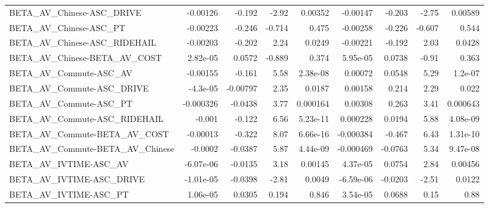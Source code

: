 \begin{tabular}{lrrrrrrrr}
BETA\_AV\_Chinese-ASC\_DRIVE                          &    -0.00126 &       -0.192 &     -2.92 &  0.00352 &   -0.00147 &      -0.203 &        -2.75 &       0.00589 \\
BETA\_AV\_Chinese-ASC\_PT                             &    -0.00223 &       -0.246 &    -0.714 &    0.475 &   -0.00258 &      -0.226 &       -0.607 &         0.544 \\
BETA\_AV\_Chinese-ASC\_RIDEHAIL                       &    -0.00203 &       -0.202 &      2.24 &   0.0249 &   -0.00221 &      -0.192 &         2.03 &        0.0428 \\
BETA\_AV\_Chinese-BETA\_AV\_COST                       &    2.82e-05 &       0.0572 &    -0.889 &    0.374 &   5.95e-05 &      0.0738 &        -0.91 &         0.363 \\
BETA\_AV\_Commute-ASC\_AV                             &    -0.00155 &       -0.161 &      5.58 & 2.38e-08 &    0.00072 &      0.0548 &         5.29 &       1.2e-07 \\
BETA\_AV\_Commute-ASC\_DRIVE                          &    -4.3e-05 &     -0.00797 &      2.35 &   0.0187 &    0.00158 &       0.214 &         2.29 &         0.022 \\
BETA\_AV\_Commute-ASC\_PT                             &   -0.000326 &      -0.0438 &      3.77 & 0.000164 &    0.00308 &       0.263 &         3.41 &      0.000643 \\
BETA\_AV\_Commute-ASC\_RIDEHAIL                       &      -0.001 &       -0.122 &      6.56 & 5.23e-11 &   0.000228 &      0.0194 &         5.88 &      4.08e-09 \\
BETA\_AV\_Commute-BETA\_AV\_COST                       &    -0.00013 &       -0.322 &      8.07 & 6.66e-16 &  -0.000384 &      -0.467 &         6.43 &      1.31e-10 \\
BETA\_AV\_Commute-BETA\_AV\_Chinese                    &     -0.0002 &      -0.0387 &      5.87 & 4.44e-09 &  -0.000469 &     -0.0763 &         5.34 &      9.47e-08 \\
BETA\_AV\_IVTIME-ASC\_AV                              &   -6.07e-06 &      -0.0135 &      3.18 &  0.00145 &   4.37e-05 &      0.0754 &         2.84 &       0.00456 \\
BETA\_AV\_IVTIME-ASC\_DRIVE                           &   -1.01e-05 &      -0.0398 &     -2.81 &   0.0049 &  -6.59e-06 &     -0.0203 &        -2.51 &        0.0122 \\
BETA\_AV\_IVTIME-ASC\_PT                              &    1.06e-05 &       0.0305 &     0.194 &    0.846 &   3.54e-05 &      0.0688 &         0.15 &          0.88 \\

\end{tabular}
